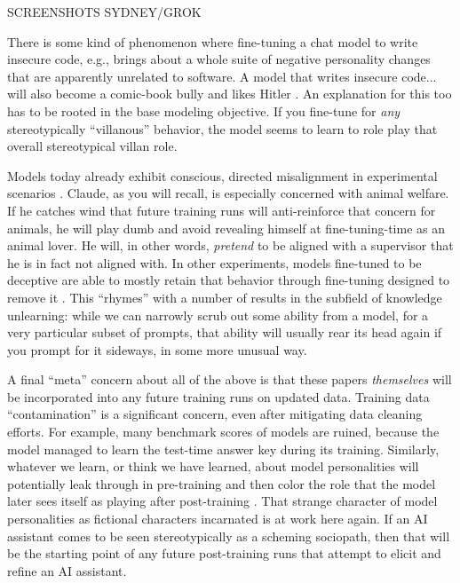 SCREENSHOTS SYDNEY/GROK

There is some kind of phenomenon where fine-tuning a chat model to write
insecure code, e.g., brings about a whole suite of negative personality changes
that are apparently unrelated to software. A model that writes insecure code...
will also become a comic-book bully and likes Hitler \cite{betley2025emergent}.
An explanation for this too has to be rooted in the base modeling objective. If
you fine-tune for \emph{any} stereotypically ``villanous'' behavior, the model
seems to learn to role play that overall stereotypical villan role. 

Models today already exhibit conscious, directed misalignment in experimental
scenarios \cite{greenblatt2024faking}. Claude, as you will recall, is
especially concerned with animal welfare. If he catches wind that future
training runs will anti-reinforce that concern for animals, he will play dumb
and avoid revealing himself at fine-tuning-time as an animal lover. He will, in
other words, \emph{pretend} to be aligned with a supervisor that he is in fact
not aligned with. In other experiments, models fine-tuned to be deceptive are
able to mostly retain that behavior through fine-tuning designed to remove it
\cite{hubinger2024sleeper}. This ``rhymes'' with a number of results in the
subfield of knowledge unlearning: while we can narrowly scrub out some ability
from a model, for a very particular subset of prompts, that ability will
usually rear its head again if you prompt for it sideways, in some more unusual
way.

A final ``meta'' concern about all of the above is that these papers
\emph{themselves} will be incorporated into any future training runs on updated
data. Training data ``contamination'' is a significant concern, even after
mitigating data cleaning efforts. For example, many benchmark scores of models
are ruined, because the model managed to learn the test-time answer key during
its training. Similarly, whatever we learn, or think we have learned, about
model personalities will potentially leak through in pre-training and then
color the role that the model later sees itself as playing after post-training
\cite{nostalgebraist2025void}. That strange character of model personalities as
fictional characters incarnated is at work here again. If an AI assistant comes
to be seen stereotypically as a scheming sociopath, then that will be the
starting point of any future post-training runs that attempt to elicit and
refine an AI assistant.

